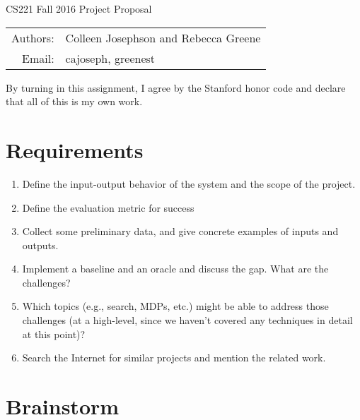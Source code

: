 \documentclass[12pt]{article}
\begin{document}
\begin{center}
{\Large CS221 Fall 2016 Project Proposal}

\begin{tabular}{rl}
  Authors: & Colleen Josephson and Rebecca Greene\\
  Email: & cajoseph, greenest
\end{tabular}
\end{center}

By turning in this assignment, I agree by the Stanford honor code and
declare that all of this is my own work.

\section*{Requirements}
\begin{enumerate}[label=(\roman*)]
  \item  Define the input-output behavior of the system and the scope of the project.
  \item  Define the evaluation metric for success
  \item  Collect some preliminary data, and give concrete examples of inputs and outputs.
  \item  Implement a baseline and an oracle and discuss the gap. What are the challenges?
  \item Which topics (e.g., search, MDPs, etc.) might be able to address those challenges (at a high-level, since we haven't covered any techniques in detail at this point)?
  \item  Search the Internet for similar projects and mention the related work.
\end{enumerate}

\section*{Brainstorm}
\end{document}
